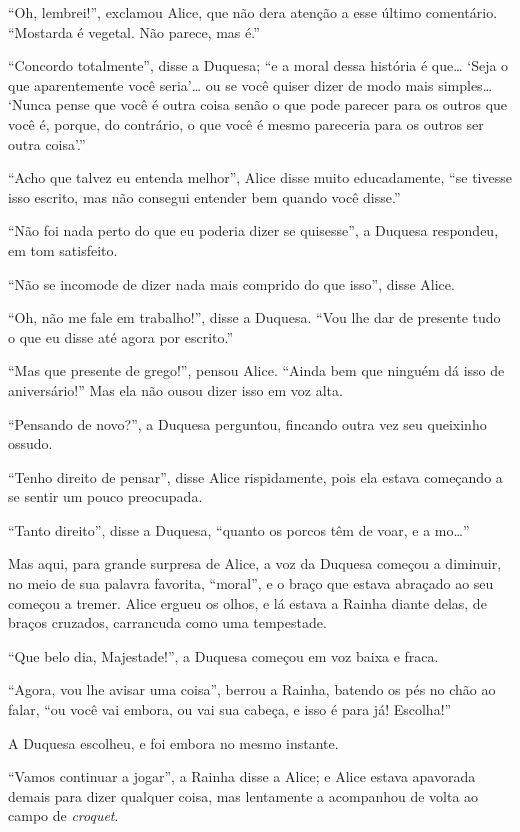 ``Oh, lembrei!'', exclamou Alice, que não dera atenção a esse último
comentário. ``Mostarda é vegetal. Não parece, mas é.''

``Concordo totalmente'', disse a Duquesa; ``e a moral dessa história é
que\ldots{} `Seja o que aparentemente você seria'\ldots{} ou se você quiser dizer
de modo mais simples\ldots{} `Nunca pense que você é outra coisa senão o que
pode parecer para os outros que você é, porque, do contrário, o que você
é mesmo pareceria para os outros ser outra coisa'.''

``Acho que talvez eu entenda melhor'', Alice disse muito educadamente,
``se tivesse isso escrito, mas não consegui entender bem quando você
disse.''

``Não foi nada perto do que eu poderia dizer se quisesse'', a Duquesa
respondeu, em tom satisfeito.

``Não se incomode de dizer nada mais comprido do que isso'', disse
Alice.

``Oh, não me fale em trabalho!'', disse a Duquesa. ``Vou lhe dar de
presente tudo o que eu disse até agora por escrito.''

``Mas que presente de grego!'', pensou Alice. ``Ainda bem que ninguém dá
isso de aniversário!'' Mas ela não ousou dizer isso em voz alta.

``Pensando de novo?'', a Duquesa perguntou, fincando outra vez seu
queixinho ossudo.

``Tenho direito de pensar'', disse Alice rispidamente, pois ela estava
começando a se sentir um pouco preocupada.

``Tanto direito'', disse a Duquesa, ``quanto os porcos têm de voar, e a
mo\ldots{}''

Mas aqui, para grande surpresa de Alice, a voz da Duquesa começou a
diminuir, no meio de sua palavra favorita, ``moral'', e o braço que
estava abraçado ao seu começou a tremer. Alice ergueu os olhos, e lá
estava a Rainha diante delas, de braços cruzados, carrancuda como uma
tempestade.

``Que belo dia, Majestade!'', a Duquesa começou em voz baixa e fraca.

``Agora, vou lhe avisar uma coisa'', berrou a Rainha, batendo os pés no
chão ao falar, ``ou você vai embora, ou vai sua cabeça, e isso é para já!
Escolha!''

A Duquesa escolheu, e foi embora no mesmo instante.

``Vamos continuar a jogar'', a Rainha disse a Alice; e Alice estava
apavorada demais para dizer qualquer coisa, mas lentamente a acompanhou
de volta ao campo de \textit{croquet}.

